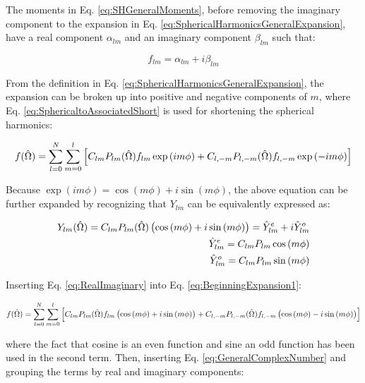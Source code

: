 \begin{tcolorbox}[breakable]
The moments in Eq. \eqref{eq:SHGeneralMoments}, before removing the imaginary component to the expansion in Eq. \eqref{eq:SphericalHarmonicsGeneralExpansion}, have a real component \(\alpha_{lm}\) and an imaginary component \(\beta_{lm}\) such that:

\begin{equation}
\label{eq:GeneralComplexNumber}
f_{lm}=\alpha_{lm}+i\beta_{lm}
\end{equation}

From the definition in Eq. \eqref{eq:SphericalHarmonicsGeneralExpansion}, the expansion can be broken up into positive and negative components of \(m\), where Eq. \eqref{eq:SphericaltoAssociatedShort} is used for shortening the spherical harmonics:

\begin{equation}
\label{eq:BeginningExpansion1}
f(\hat{\Omega}  )=\sum_{l=0}^{N}\sum_{m=0}^{l}\left\lbrack C_{lm}P_{lm}(\hat{\Omega}  )f_{lm}\exp{(im\phi)}+C_{l,-m}P_{l,-m}(\hat{\Omega}  )f_{l,-m}\exp{(-im\phi)}\right\rbrack
\end{equation}

Because \(\exp{(im\phi)}=\cos{(m\phi)}+i\sin{(m\phi)}\), the above equation can be further expanded by recognizing that \(Y_{lm}\) can be equivalently expressed as:

\begin{equation}
\label{eq:RealImaginary}
\begin{aligned}
Y_{lm}(\hat{\Omega}  )=C_{lm}P_{lm}(\hat{\Omega}  )\left(\cos{(m\phi)}+i\sin{(m\phi)}\right)=\hat{Y}_{lm}^e+i\hat{Y}_{lm}^o\\
\hat{Y}_{lm}^e=C_{lm}P_{lm}\cos{(m\phi)}\\
\hat{Y}_{lm}^o=C_{lm}P_{lm}\sin{(m\phi)}\\
\end{aligned}
\end{equation}

Inserting Eq. \eqref{eq:RealImaginary} into Eq. \eqref{eq:BeginningExpansion1}:

\begin{equation}
f(\hat{\Omega}  )=\sum_{l=0}^{N}\sum_{m=0}^{l}\left\lbrack C_{lm}P_{lm}(\hat{\Omega}  )f_{lm}\left(\cos{(m\phi)}+i\sin{(m\phi)}\right)+C_{l,-m}P_{l,-m}(\hat{\Omega}  )f_{l,-m}\left(\cos{(m\phi)}-i\sin{(m\phi)}\right)\right\rbrack
\end{equation}

where the fact that cosine is an even function and sine an odd function has been used in the second term. Then, inserting Eq. \eqref{eq:GeneralComplexNumber} and grouping the terms by real and imaginary components:


\end{tcolorbox}
